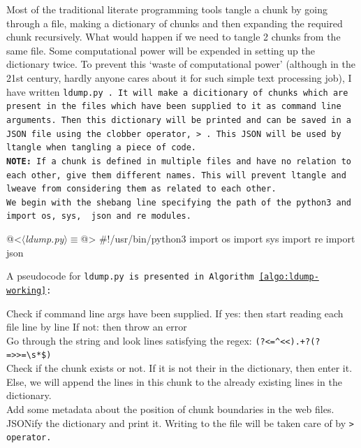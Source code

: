 Most of the traditional literate programming tools tangle a chunk by going through a file, making a dictionary
of chunks and then expanding the required chunk recursively. What would happen if we need to tangle 2 chunks
from the same file. Some computational power will be expended in setting up the dictionary twice. To prevent
this `waste of computational power' (although in the 21st century, hardly anyone cares about it for such
simple text processing job), I have written \tt ldump.py \rm. It will make a dicitionary of chunks which are
present in the files which have been supplied to it as command line arguments. Then this dictionary will be
printed and can be saved in a JSON file using the clobber operator, \tt > \rm. This JSON will be used by \tt
ltangle \rm when tangling a piece of code. \\

\textbf{NOTE:} If a chunk is defined in multiple files and have no relation to each other, give them different
names. This will prevent \tt ltangle \rm and \tt lweave \rm from considering them as related to each other.\\

We begin with the shebang line specifying the path of the python3 and import \tt os\rm, \tt sys\rm, \tt
json \rm and \tt re \rm modules.

\begin{code}[ldump.py]
@<$\langle$\textit{ldump.py}$\rangle\equiv$@>
#!/usr/bin/python3
import os
import sys
import re
import json

\end{code}

A pseudocode for \tt ldump.py \rm is presented in Algorithm~\ref{algo:ldump-working}:

\begin{algorithm}

Check if command line args have been supplied. \linebreak
If yes: then start reading each file line by line \linebreak
If not: then throw an error\\

Go through the string and look lines satisfying the regex: \linebreak
    \verb|(?<=^<<).+?(?=>>=\s*$)|\\

Check if the chunk exists or not. If it is not their in the dictionary, then enter it. Else, we will append
the lines in this chunk to the already existing lines in the dictionary.\\

Add some metadata about the position of chunk boundaries in the web files.\\

JSONify the dictionary and print it. Writing to the file will be taken care of by \tt > \rm operator.

\caption{Pseudocode for \texttt{ldump.py}}
\label{algo:ldump-working}
\end{algorithm}

